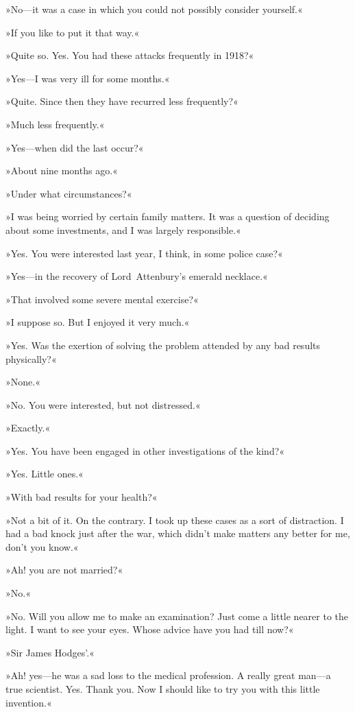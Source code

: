 »No—it was a case in which you could not possibly consider yourself.«

»If you like to put it that way.«

»Quite so. Yes. You had these attacks frequently in 1918?«

»Yes—I was very ill for some months.«

»Quite. Since then they have recurred less frequently?«

»Much less frequently.«

»Yes—when did the last occur?«

»About nine months ago.«

»Under what circumstances?«

»I was being worried by certain family matters. It was a question of deciding about some investments, and I was largely responsible.«

»Yes. You were interested last year, I think, in some police case?«

»Yes—in the recovery of Lord~Attenbury's emerald necklace.«

»That involved some severe mental exercise?«

»I suppose so. But I enjoyed it very much.«

»Yes. Was the exertion of solving the problem attended by any bad results physically?«

»None.«

»No. You were interested, but not distressed.«

»Exactly.«

»Yes. You have been engaged in other investigations of the kind?«

»Yes. Little ones.«

»With bad results for your health?«

»Not a bit of it. On the contrary. I took up these cases as a sort of distraction. I had a bad knock just after the war, which didn't make matters any better for me, don't you know.«

»Ah! you are not married?«

»No.«

»No. Will you allow me to make an examination? Just come a little nearer to the light. I want to see your eyes. Whose advice have you had till now?«

»Sir James Hodges'.«

»Ah! yes—he was a sad loss to the medical profession. A really great man—a true scientist. Yes. Thank you. Now I should like to try you with this little invention.«

